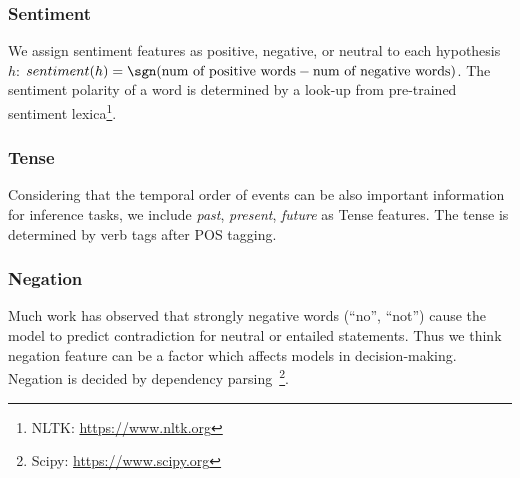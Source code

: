 
%

\subsubsection{Sentiment}

We assign sentiment features as 
positive, negative, or neutral to each hypothesis $h$: 
$sentiment(h) = \sgn(\mbox{num of positive words} - \mbox{num of negative words})$.
The sentiment polarity of a word
is determined by a look-up from pre-trained
sentiment lexica\footnote{NLTK: \url{https://www.nltk.org}}. 

\subsubsection{Tense}

Considering that the temporal order of events can be also 
important information for inference tasks, we include 
\textit{past}, \textit{present}, \textit{future} as Tense features. 
The tense is determined by verb tags after POS tagging.

\subsubsection{Negation}

Much work has observed that strongly negative words (``no'', ``not'') 
cause the model to predict contradiction for
neutral or entailed statements. Thus we think negation feature can be a factor which affects models in decision-making. 
Negation is decided by dependency parsing~\footnote{Scipy: \url{https://www.scipy.org}}.

